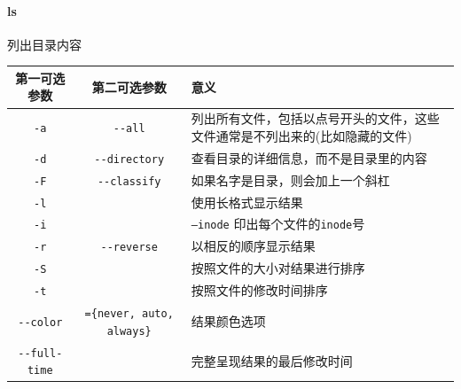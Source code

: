 \documentclass[UTF8,a4paper,12pt]{ctexbook}
\begin{document}
		 \paragraph{ls}列出目录内容
			\begin{table}[H]
				\centering
				\caption{\textbf{ls }参数说明}
				\begin{longtable}{c|c|m{10cm}}
					\hline 
					第一可选参数 & 第二可选参数 & 意义\\
					\hline
					\verb|-a|  & \verb|--all| & 列出所有文件，包括以点号开头的文件，这些文件通常是不列出来的(比如隐藏的文件)\\
					\verb|-d|  & \verb|--directory| & 查看目录的详细信息，而不是目录里的内容\\
					\verb|-F|  & \verb|--classify|  & 如果名字是目录，则会加上一个斜杠\\
					\verb|-l|  & 			  & 使用长格式显示结果\\
					\verb|-i|  &			  & \verb|–inode| 印出每个文件的\verb|inode|号\\
					\verb|-r|  & \verb|--reverse|   & 以相反的顺序显示结果\\
					\verb|-S|  & 			  & 按照文件的大小对结果进行排序\\
					\verb|-t|  &			  & 按照文件的修改时间排序\\
					\verb|--color|  	& 	\verb|={never, auto, always}|			  & 结果颜色选项\\
					\verb|--full-time|  &	\verb| |		 						  & 完整呈现结果的最后修改时间 \\
					\hline
				\end{longtable}
			\end{table}
\end{document}
